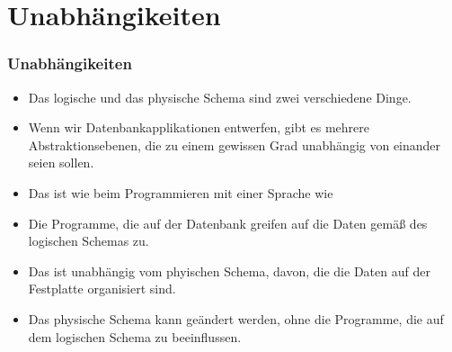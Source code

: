 \documentclass[aspectratio=169,mathserif,notheorems]{beamer}%
\begin{document}
\section{Unabhängikeiten}%
%
\begin{frame}%
\frametitle{Unabhängikeiten}%
\begin{itemize}%
\item Das logische und das physische Schema sind zwei verschiedene Dinge.%
\item<2-> Wenn wir Datenbankapplikationen entwerfen, gibt es mehrere Abstraktionsebenen, die zu einem gewissen Grad unabhängig von einander seien sollen.%
%
\item<3-> Das ist wie beim Programmieren mit einer Sprache wie \python{}%
%
\item<6-> Die Programme, die auf der Datenbank  greifen auf die Daten gemäß des logischen Schemas zu.%
\item<7-> Das ist unabhängig vom phyischen Schema, davon, die die Daten auf der Festplatte organisiert sind.%
\item<8-> Das physische Schema kann geändert werden, ohne die Programme, die auf dem logischen Schema  zu beeinflussen.%
\end{itemize}%
\end{frame}%
%
\end{document}
